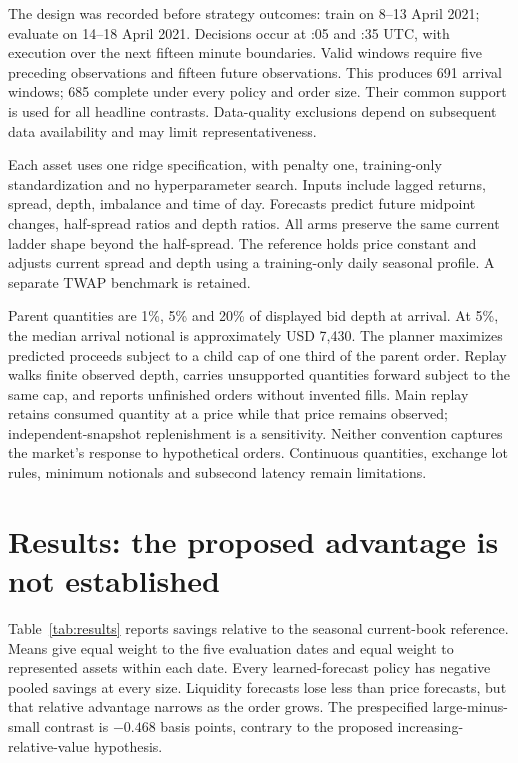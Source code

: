 \documentclass[10pt,a4paper]{article}
\begin{document}
The design was recorded before strategy outcomes: train on 8--13 April 2021; evaluate on 14--18 April 2021. Decisions occur at :05 and :35 UTC, with execution over the next fifteen minute boundaries. Valid windows require five preceding observations and fifteen future observations. This produces 691 arrival windows; 685 complete under every policy and order size. Their common support is used for all headline contrasts. Data-quality exclusions depend on subsequent data availability and may limit representativeness.

Each asset uses one ridge specification, with penalty one, training-only standardization and no hyperparameter search. Inputs include lagged returns, spread, depth, imbalance and time of day. Forecasts predict future midpoint changes, half-spread ratios and depth ratios. All arms preserve the same current ladder shape beyond the half-spread. The reference holds price constant and adjusts current spread and depth using a training-only daily seasonal profile. A separate TWAP benchmark is retained.

Parent quantities are 1\%, 5\% and 20\% of displayed bid depth at arrival. At 5\%, the median arrival notional is approximately USD 7,430. The planner maximizes predicted proceeds subject to a child cap of one third of the parent order. Replay walks finite observed depth, carries unsupported quantities forward subject to the same cap, and reports unfinished orders without invented fills. Main replay retains consumed quantity at a price while that price remains observed; independent-snapshot replenishment is a sensitivity. Neither convention captures the market's response to hypothetical orders. Continuous quantities, exchange lot rules, minimum notionals and subsecond latency remain limitations.

\section{Results: the proposed advantage is not established}
Table~\ref{tab:results} reports savings relative to the seasonal current-book reference. Means give equal weight to the five evaluation dates and equal weight to represented assets within each date. Every learned-forecast policy has negative pooled savings at every size. Liquidity forecasts lose less than price forecasts, but that relative advantage narrows as the order grows. The prespecified large-minus-small contrast is $-0.468$ basis points, contrary to the proposed increasing-relative-value hypothesis.
\end{document}
